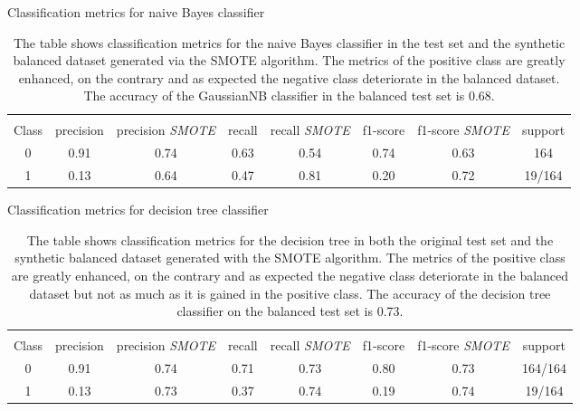 \documentclass[11pt]{article}
\theoremstyle{definition}
\theoremstyle{remark}
\begin{document}
\begin{table}[H]
\caption{Classification metrics for naive Bayes classifier} \label{tab:nb_smote} 
\begin{center} 
\begin{tabular}{cccccccc}
\hline
\multicolumn{1}{c}{} \\
Class & precision & precision \textit{SMOTE}& recall & recall \textit{SMOTE}& f1-score & f1-score \textit{SMOTE} & support     \\
\hline
0 & 0.91  & 0.74  &  0.63  & 0.54 &  0.74   &  0.63 &  164 \\
1 & 0.13  & 0.64 &   0.47  & 0.81 &  0.20   &  0.72 &  19/164 \\
\hline
\end{tabular}
\caption{The table shows classification metrics for the naive Bayes classifier in the test set and the synthetic balanced dataset generated via the SMOTE algorithm. The metrics of the positive class are greatly enhanced, on the contrary and as expected the negative class deteriorate in the balanced dataset. The accuracy of the GaussianNB classifier in the balanced test set is 0.68.}
\end{center}
\end{table}

\begin{table}[H]
\caption{Classification metrics for decision tree classifier} \label{tab:dt_smote} 
\begin{center} 
\begin{tabular}{cccccccc}
\hline
\multicolumn{1}{c}{} \\
Class & precision & precision \textit{SMOTE}& recall & recall \textit{SMOTE}& f1-score & f1-score \textit{SMOTE} & support     \\
\hline
0 & 0.91  & 0.74  & 0.71   & 0.73  &  0.80   &  0.73 &  164/164 \\
1 & 0.13  & 0.73  & 0.37  & 0.74  &   0.19   & 0.74 &   19/164 \\
\hline
\end{tabular}
\caption{The table shows classification metrics for the decision tree in both the original test set and the synthetic balanced dataset generated with the SMOTE algorithm. The metrics of the positive class are greatly enhanced, on the contrary and as expected the negative class deteriorate in the balanced dataset but not as much as it is gained in the positive  class. The accuracy of the decision tree classifier on the balanced test set is 0.73.}
\end{center}
\end{table}
\end{document}
